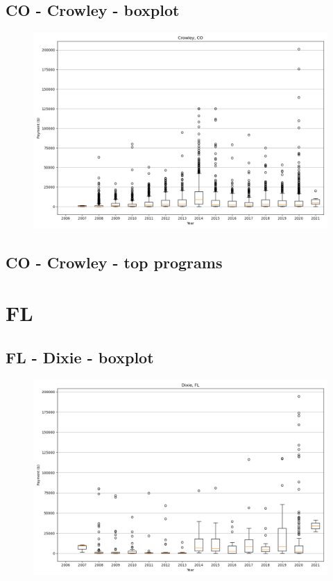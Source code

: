 \subsection*{CO - Crowley - boxplot}
\begin{figure}[h]
\centering
\includegraphics[width=7in]{../output/boxplots/counties/Crowley-CO_boxplot.png}
\end{figure}


\subsection*{CO - Crowley - top programs}

\newpage
\section*{FL}
\subsection*{FL - Dixie - boxplot}
\begin{figure}[h]
\centering
\includegraphics[width=7in]{../output/boxplots/counties/Dixie-FL_boxplot.png}
\end{figure}



